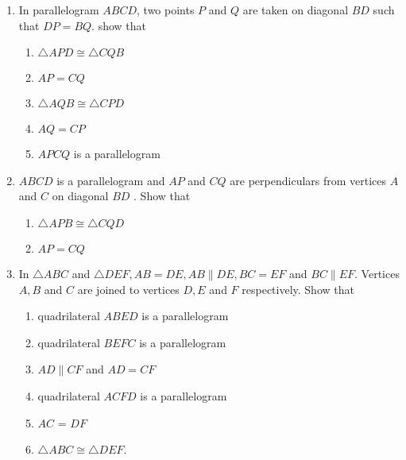 \begin{enumerate}[label=\arabic*.,ref=\thesubsection.\theenumi]
\item In parallelogram $ABCD$, two points $P$ and $Q$ are taken on diagonal $BD$ such that $DP = BQ$. show that \begin{enumerate}
 \item  $\triangle  APD  \cong   \triangle  CQB$ 
\item $AP = CQ$ \item  $\triangle  AQB  \cong   \triangle  CPD$ 
\item $AQ = CP$ 
\item $APCQ$ is a parallelogram
\end{enumerate}
\item $ABCD$ is a parallelogram and $AP$ and $CQ$ are perpendiculars from vertices $A$ and $C$ on diagonal $BD$ . Show that 
\begin{enumerate} 
\item  $\triangle  APB  \cong   \triangle  CQD $ 
\item $AP = CQ$
\end{enumerate}
%
\item In  $\triangle  ABC$ and  $\triangle  DEF, AB = DE, AB  \parallel  DE, BC = EF$ and $BC  \parallel  EF$. Vertices $A, B$ and $C$ are joined to vertices $D, E$ and $F$ respectively. Show that 
\begin{enumerate}
\item quadrilateral $ABED$ is a parallelogram 
\item quadrilateral $BEFC$ is a parallelogram 
\item $AD  \parallel  CF$ and $AD = CF$ 
\item quadrilateral $ACFD$ is a parallelogram 
\item $AC$ = $DF$ 
\item  $\triangle  ABC  \cong   \triangle  DEF$.
%
\end{enumerate}


\end{enumerate}
